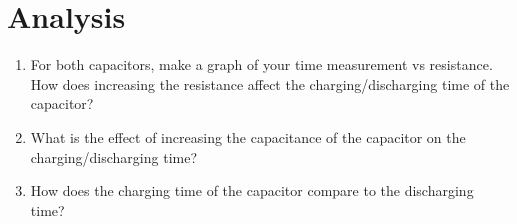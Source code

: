 \documentclass{article}
\begin{document}
\section*{Analysis}
\begin{enumerate}
	\item For both capacitors, make a graph of your time measurement vs resistance. How does increasing the resistance affect the charging/discharging time of the capacitor?
	\item What is the effect of increasing the capacitance of the capacitor on the charging/discharging time?
	\item How does the charging time of the capacitor compare to the discharging time?
\end{enumerate}
\end{document}
